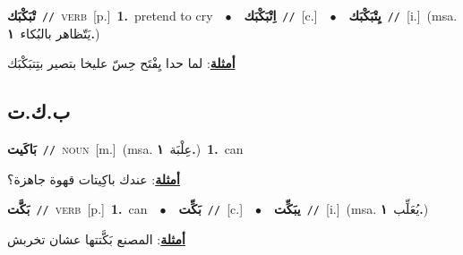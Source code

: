 \documentclass[10pt,a4paper,twoside]{article} %
\begin{document}
\begin{multicols}{2}
{\setlength\topsep{0pt}\textbf{\foreignlanguage{arabic}{تْبَكْبَك}}\ {\color{gray}\texttt{//}\color{black}}\ \textsc{verb}\ [p.]\ \textbf{1.}~pretend to cry\ \ $\bullet$\ \ \setlength\topsep{0pt}\textbf{\foreignlanguage{arabic}{اِتْبَكْبَك}}\ {\color{gray}\texttt{//}\color{black}}\ [c.]\ \ $\bullet$\ \ \setlength\topsep{0pt}\textbf{\foreignlanguage{arabic}{يِتْبَكْبَك}}\ {\color{gray}\texttt{//}\color{black}}\ [i.]\ \color{gray}(msa. \foreignlanguage{arabic}{يَتّظاهر بالبُكاء}~\foreignlanguage{arabic}{\textbf{١.}})\color{black}\  \begin{flushright}\color{gray}\foreignlanguage{arabic}{\textbf{\underline{\foreignlanguage{arabic}{أمثلة}}}: لما حدا يِفْتَح حِسّ عليخا بتصير بتِتبَكْبَك}\end{flushright}\color{black}} \vspace{2mm}

\vspace{-3mm}
\subsection*{\color{blue}\foreignlanguage{arabic}{ب.ك.ت}\color{blue}{}} 

{\setlength\topsep{0pt}\textbf{\foreignlanguage{arabic}{بَاكَيت}}\ {\color{gray}\texttt{//}\color{black}}\ \textsc{noun}\ [m.]\ \color{gray}(msa. \foreignlanguage{arabic}{عِلْبَة}~\foreignlanguage{arabic}{\textbf{١.}})\color{black}\ \textbf{1.}~can\  \begin{flushright}\color{gray}\foreignlanguage{arabic}{\textbf{\underline{\foreignlanguage{arabic}{أمثلة}}}: عندك باكِيتات قهوة جاهزة؟}\end{flushright}\color{black}} \vspace{2mm}

{\setlength\topsep{0pt}\textbf{\foreignlanguage{arabic}{بَكَّت}}\ {\color{gray}\texttt{//}\color{black}}\ \textsc{verb}\ [p.]\ \textbf{1.}~can\ \ $\bullet$\ \ \setlength\topsep{0pt}\textbf{\foreignlanguage{arabic}{بَكِّت}}\ {\color{gray}\texttt{//}\color{black}}\ [c.]\ \ $\bullet$\ \ \setlength\topsep{0pt}\textbf{\foreignlanguage{arabic}{يبَكِّت}}\ {\color{gray}\texttt{//}\color{black}}\ [i.]\ \color{gray}(msa. \foreignlanguage{arabic}{يُعَلِّب}~\foreignlanguage{arabic}{\textbf{١.}})\color{black}\  \begin{flushright}\color{gray}\foreignlanguage{arabic}{\textbf{\underline{\foreignlanguage{arabic}{أمثلة}}}: المصنع بَكَّتتها عشان تخربش}\end{flushright}\color{black}} \vspace{2mm}


\end{multicols}
\end{document}
